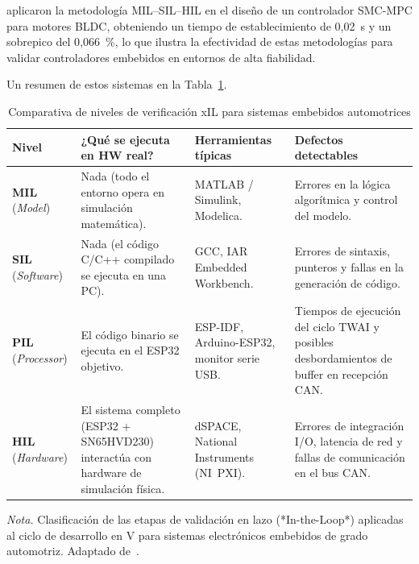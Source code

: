 \citet{SlidingModeBLDC2025} aplicaron la metodología
MIL--SIL--HIL en el diseño de un controlador SMC-MPC para
motores BLDC, obteniendo un tiempo de establecimiento de
0{,}02~s y un sobrepico del 0{,}066~\%, lo que ilustra la
efectividad de estas metodologías para validar controladores
embebidos en entornos de alta fiabilidad.

Un resumen de estos sistemas en la Tabla~\ref{tab:xil_comparativa}.

\begin{table}[h]
	\centering
	\captionsetup{labelformat=simple, labelsep=newline,
		textfont=it, labelfont=bf}
	\caption{Comparativa de niveles de verificación xIL
		para sistemas embebidos automotrices}
	\label{tab:xil_comparativa}
	
	\begin{tabularx}{\linewidth}{l X X X}
		\toprule
		\rowcolor[rgb]{0.851, 0.851, 0.851}
		\textbf{Nivel} &
		\textbf{¿Qué se ejecuta en HW real?} &
		\textbf{Herramientas típicas} &
		\textbf{Defectos detectables} \\
		\midrule
		\textbf{MIL} (\textit{Model}) &
		Nada (todo el entorno opera en simulación
		matemática). &
		MATLAB / Simulink, Modelica. &
		Errores en la lógica algorítmica y control del
		modelo. \\
		\addlinespace
		\textbf{SIL} (\textit{Software}) &
		Nada (el código C/C++ compilado se ejecuta en
		una PC). &
		GCC, IAR Embedded Workbench. &
		Errores de sintaxis, punteros y fallas en la
		generación de código. \\
		\addlinespace
		\textbf{PIL} (\textit{Processor}) &
		El código binario se ejecuta en el ESP32
		objetivo. &
		ESP-IDF, Arduino-ESP32, monitor serie USB. &
		Tiempos de ejecución del ciclo TWAI y posibles
		desbordamientos de buffer en recepción CAN. \\
		\addlinespace
		\textbf{HIL} (\textit{Hardware}) &
		El sistema completo (ESP32 + SN65HVD230)
		interactúa con hardware de simulación física. &
		dSPACE, National Instruments (NI~PXI). &
		Errores de integración I/O, latencia de red y
		fallas de comunicación en el bus CAN. \\
		\bottomrule
	\end{tabularx}
	\vspace{0.2cm}
	
	\begin{flushleft}
		\footnotesize \textit{Nota.} Clasificación de las
		etapas de validación en lazo (*In-the-Loop*)
		aplicadas al ciclo de desarrollo en V para sistemas
		electrónicos embebidos de grado automotriz.
		Adaptado de~\citep{VVDNTech2024}.
	\end{flushleft}
\end{table}


